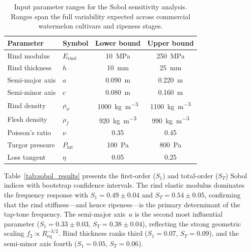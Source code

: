 \begin{table}[t]
  \centering
  \caption{Input parameter ranges for the Sobol sensitivity analysis.
    Ranges span the full variability expected across commercial
    watermelon cultivars and ripeness stages.}
  \label{tab:sobol_inputs}
  \begin{tabular}{llcc}
    \toprule
    Parameter & Symbol & Lower bound & Upper bound \\
    \midrule
    Rind modulus    & $E_{\mathrm{rind}}$ & \SI{10}{\mega\pascal}   & \SI{250}{\mega\pascal} \\
    Rind thickness  & $h$                 & \SI{10}{\milli\metre}   & \SI{25}{\milli\metre}  \\
    Semi-major axis & $a$                 & \SI{0.090}{\metre}      & \SI{0.220}{\metre}     \\
    Semi-minor axis & $c$                 & \SI{0.080}{\metre}      & \SI{0.160}{\metre}     \\
    Rind density    & $\rho_w$            & \SI{1000}{\kilogram\per\metre\cubed} & \SI{1100}{\kilogram\per\metre\cubed} \\
    Flesh density   & $\rho_f$            & \SI{920}{\kilogram\per\metre\cubed}  & \SI{990}{\kilogram\per\metre\cubed}  \\
    Poisson's ratio & $\nu$               & 0.35  & 0.45  \\
    Turgor pressure & $P_{\mathrm{int}}$  & \SI{100}{\pascal} & \SI{800}{\pascal} \\
    Loss tangent    & $\eta$              & 0.05  & 0.25  \\
    \bottomrule
  \end{tabular}
\end{table}

Table~\ref{tab:sobol_results} presents the first-order ($S_1$) and
total-order ($S_T$) Sobol indices with bootstrap confidence intervals.
The rind elastic modulus dominates
the frequency response with $S_1 = 0.49 \pm 0.04$ and
$S_T = 0.54 \pm 0.05$, confirming
that the rind stiffness---and hence ripeness---is the primary
determinant of the tap-tone frequency.  The semi-major axis~$a$ is the
second most influential parameter ($S_1 = 0.33 \pm 0.03$,
$S_T = 0.38 \pm 0.04$),
reflecting the strong geometric scaling $f_2 \propto R_{\mathrm{eq}}^{-3/2}$.
Rind thickness ranks third ($S_1 = 0.07$, $S_T = 0.09$), and the
semi-minor axis fourth ($S_1 = 0.05$, $S_T = 0.06$).

